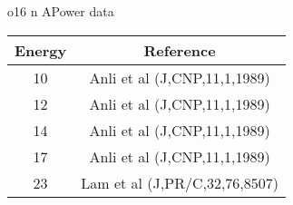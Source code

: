 \caption{o16 n APower data}\begin{tabular}{|c||c|} 
 \hline 
\bf{Energy} & \bf{Reference} \\
 \hline
 \hline 
10 & Anli et al (J,CNP,11,1,1989)\\
12 & Anli et al (J,CNP,11,1,1989)\\
14 & Anli et al (J,CNP,11,1,1989)\\
17 & Anli et al (J,CNP,11,1,1989)\\
23 & Lam et al (J,PR/C,32,76,8507)\\
\end{tabular}
